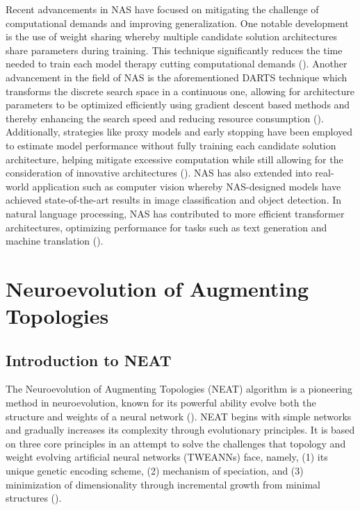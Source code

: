 \parbreak\noindent Recent advancements in NAS have focused on mitigating the challenge of computational demands and improving generalization. One notable development is the use of weight sharing whereby multiple candidate solution architectures share parameters during training. This technique significantly reduces the time needed to train each model therapy cutting computational demands (\cite{pham2018efficient}). Another advancement in the field of NAS is the aforementioned DARTS technique which transforms the discrete search space in a continuous one, allowing for architecture parameters to be optimized efficiently using gradient descent based methods and thereby enhancing the search speed and reducing resource consumption (\cite{liu2021survey}). Additionally, strategies like proxy models and early stopping have been employed to estimate model performance without fully training each candidate solution architecture, helping mitigate excessive computation while still allowing for the consideration of innovative architectures (\cite{liu2021survey}). NAS has also extended into real-world application such as computer vision whereby NAS-designed models have achieved state-of-the-art results in image classification and object detection. In natural language processing, NAS has contributed to more efficient transformer architectures, optimizing performance for tasks such as text generation and machine translation (\cite{elsken2019neural}).


\section{Neuroevolution of Augmenting Topologies}\label{sec:ne_neat}
\subsection{Introduction to NEAT}
The Neuroevolution of Augmenting Topologies (NEAT) algorithm is a pioneering method in neuroevolution, known for its powerful ability evolve both the structure and weights of a neural network (\cite{stanley2019designing}). NEAT begins with simple networks and gradually increases its complexity through evolutionary principles. It is based on three core principles in an attempt to solve the challenges that topology and weight evolving artificial neural networks (TWEANNs) face, namely, (1) its unique genetic encoding scheme, (2) mechanism of speciation, and (3) minimization of dimensionality through incremental growth from minimal structures (\cite{stanley2002evolving}).


